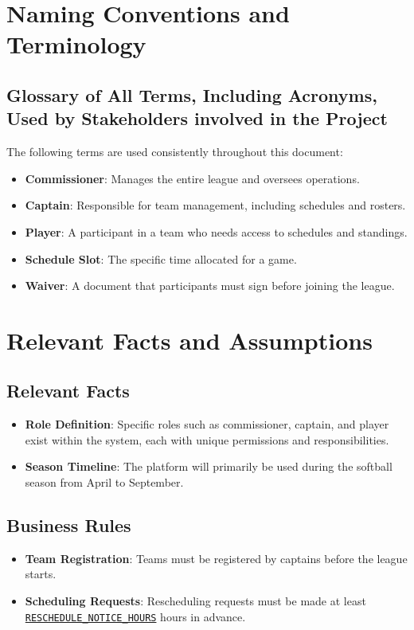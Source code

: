 \documentclass[12pt, titlepage]{article}
\begin{document}
\section{Naming Conventions and Terminology}

\subsection{Glossary of All Terms, Including Acronyms, Used by Stakeholders involved in the Project}
The following terms are used consistently throughout this document:
\begin{itemize}
    \item \textbf{Commissioner}: Manages the entire league and oversees operations.
    \item \textbf{Captain}: Responsible for team management, including schedules and rosters.
    \item \textbf{Player}: A participant in a team who needs access to schedules and standings.
    \item \textbf{Schedule Slot}: The specific time allocated for a game.
    \item \textbf{Waiver}: A document that participants must sign before joining the league.
\end{itemize}

\section{Relevant Facts and Assumptions}

\subsection{Relevant Facts}
\begin{itemize}
    \item \textbf{Role Definition}: Specific roles such as commissioner, captain, and player exist within the system, each with unique permissions and responsibilities.
    \item \textbf{Season Timeline}: The platform will primarily be used during the softball season from April to September.
\end{itemize}

\subsection{Business Rules}
\begin{itemize}
    \item \textbf{Team Registration}: Teams must be registered by captains before the league starts.
    \item \textbf{Scheduling Requests}: Rescheduling requests must be made at least \hyperref[RESCHEDULE_NOTICE_HOURS]{\texttt{RESCHEDULE\_NOTICE\_HOURS}} hours in advance.
\end{itemize}
\end{document}
